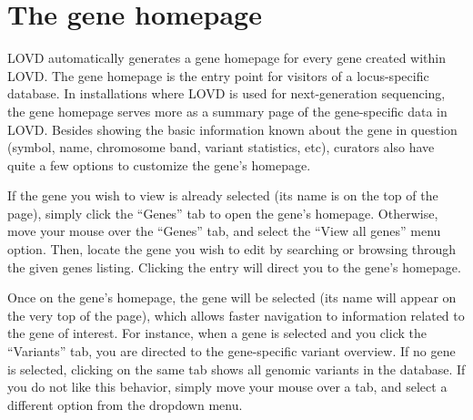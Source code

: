 \documentclass[a4paper,oneside,openany,12pt]{memoir}
\renewenvironment{leftbar}[1][\hsize]
{%
    \def\FrameCommand
    {%
        {\color{LOVDdark}\vrule width 3pt \hspace{5pt}}%
        \colorbox{LOVDlight}%
    }%
    \MakeFramed{\hsize#1\advance\hsize-\width\FrameRestore}%
}
{\endMakeFramed}
\begin{document}
\section{The gene homepage}
LOVD automatically generates a gene homepage for every gene created within LOVD.
The gene homepage is the entry point for visitors of a locus-specific database.
In installations where LOVD is used for next-generation sequencing, the gene homepage serves more as a summary page of the gene-specific data in LOVD.
Besides showing the basic information known about the gene in question (symbol, name,
 chromosome band, variant statistics, etc), curators also have quite a few options to customize the gene's homepage.
\\
\par
If the gene you wish to view is already selected (its name is on the top of the page), simply click the ``Genes'' tab to open the gene's homepage.
Otherwise, move your mouse over the ``Genes'' tab, and select the ``View all genes'' menu option.
Then, locate the gene you wish to edit by searching or browsing through the given genes listing.
Clicking the entry will direct you to the gene's homepage.
\par
Once on the gene's homepage, the gene will be selected (its name will appear on the very top of the page),
 which allows faster navigation to information related to the gene of interest.
For instance, when a gene is selected and you click the ``Variants'' tab, you are directed to the gene-specific variant overview.
If no gene is selected, clicking on the same tab shows all genomic variants in the database.
If you do not like this behavior, simply move your mouse over a tab, and select a different option from the dropdown menu.
\end{document}
